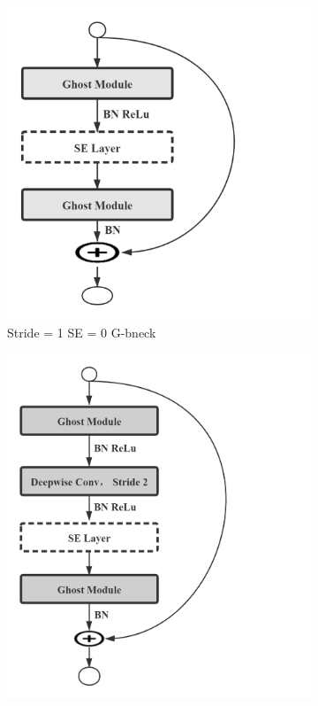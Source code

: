 \begin{figure}[h]
	\begin{center}
		\begin{subfigure}[b]{0.49\textwidth}
		    \centering
			\includegraphics[width=\textwidth]{thesis-template-master/images/stride1 module.png}
			\caption{Stride = 1 SE = 0 G-bneck}
			\label{fig:cellnet}
		\end{subfigure}
		\begin{subfigure}[b]{0.49\textwidth}
		    \centering
			\includegraphics[width=\textwidth]{thesis-template-master/images/stride2 module.png}

\end{subfigure}
\end{center}
\end{figure}
